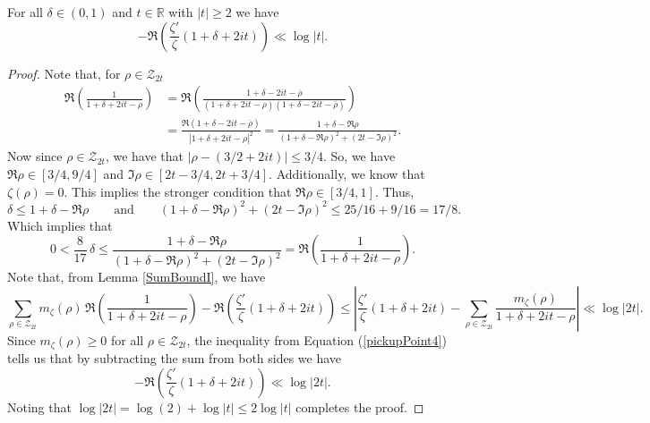 \begin{theorem}[ShiftTwoBound]
\label{ShiftTwoBound}
\leanok
For all $\delta\in (0,1)$ and $t\in\mathbb{R}$ with $|t|\geq 2$ we have
    $$-\Re \left(\frac{\zeta'}{\zeta}(1+\delta+2it)\right)\ll\log|t|.$$
\end{theorem}
\begin{proof}
\leanok
Note that, for $\rho\in\mathcal{Z}_{2t}$
    \begin{align*}
        \Re \left(\frac{1}{1+\delta+2it-\rho}\right)
          &=\Re \left(\frac{1+\delta-2it-\overline{\rho}}
            {(1+\delta+2it-\rho)(1+\delta-2it-\overline{\rho})}\right) \\
          &=\frac{\Re (1+\delta-2it-\overline{\rho})}{|1+\delta+2it-\rho|^2}
            =\frac{1+\delta-\Re \rho}{(1+\delta-\Re \rho)^2+(2t-\mathfrak{I}\rho)^2}.
    \end{align*}
    Now since $\rho\in\mathcal{Z}_{2t}$, we have that $|\rho-(3/2+2it)|\leq 3/4$. So,
    we have $\Re \rho\in[3/4,9/4]$ and $\mathfrak{I}\rho\in[2t-3/4,2t+3/4]$. Additionally,
    we know that $\zeta(\rho)=0$. This implies the stronger condition that $\Re \rho\in[3/4,1]$.
    Thus,
    $$\delta\leq 1+\delta-\Re \rho\qquad\text{and}\qquad
      (1+\delta-\Re \rho)^2+(2t-\mathfrak{I}\rho)^2\leq 25/16+9/16=17/8.$$
    Which implies that
    \begin{equation}\label{pickupPoint4}
        0<\frac{8}{17}\,\delta
          \leq\frac{1+\delta-\Re \rho}{(1+\delta-\Re \rho)^2+(2t-\mathfrak{I}\rho)^2}
          =\Re \left(\frac{1}{1+\delta+2it-\rho}\right).
    \end{equation}
    Note that, from Lemma \ref{SumBoundI}, we have
    $$\sum_{\rho\in\mathcal{Z}_{2t}}m_\zeta(\rho)\,
      \Re \left(\frac{1}{1+\delta+2it-\rho}\right)
      -\Re \left(\frac{\zeta'}{\zeta}(1+\delta+2it)\right)
      \leq\left|\frac{\zeta'}{\zeta}(1+\delta+2it)
      -\sum_{\rho\in\mathcal{Z}_{2t}}\frac{m_\zeta(\rho)}{1+\delta+2it-\rho}\right|
      \ll\log|2t|.$$
    Since $m_\zeta(\rho)\geq 0$ for all $\rho\in\mathcal{Z}_{2t}$, the inequality from
    Equation (\ref{pickupPoint4}) tells us that by subtracting the sum from both sides
    we have
    $$-\Re \left(\frac{\zeta'}{\zeta}(1+\delta+2it)\right)\ll\log|2t|.$$
    Noting that $\log|2t|=\log(2)+\log|t|\leq2\log|t|$ completes the proof.
\end{proof}

